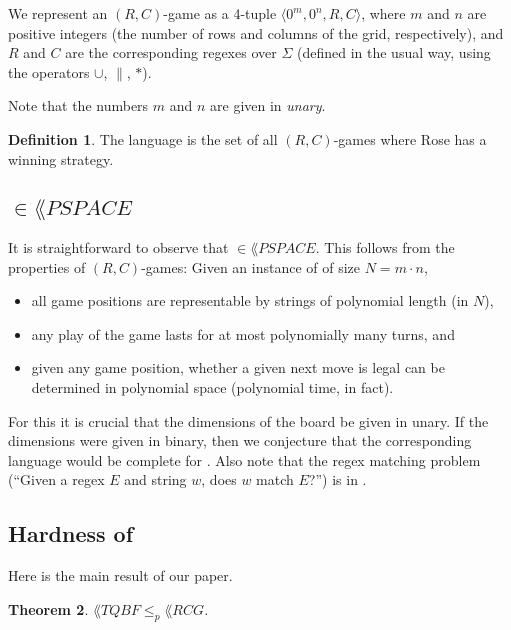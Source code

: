 \documentclass{article}
\newcommand{\0}{\mathbf{0}}
\newcommand{\1}{\mathbf{1}}
\newcommand{\2}{\mathbf{2}}
\newcommand{\RCG}{\lang{RCG}}
\newcommand{\tup}[1]{\langle{} #1 \rangle{}}
\newcommand{\reducp}[2]{{{#1} \le_p {#2}}}
\newcounter{row}
\newcounter{col}
\theoremstyle{plain}
\newtheorem{theorem}{Theorem}
\theoremstyle{definition}
\newtheorem{definition}[theorem]{Definition}
\begin{document}
We represent an $(R,C)$-game as a 4-tuple $\tup{0^m,0^n,R,C}$, where $m$ and $n$ are positive integers (the number of rows and columns of the grid, respectively), and $R$ and $C$ are the corresponding regexes over $\Sigma$ (defined in the usual way, using the operators $\cup$, $\|$, $*$).

Note that the numbers $m$ and $n$ are given in \emph{unary}.

\begin{definition}
  The language \emph{\RCG} is the set of all $(R,C)$-games where Rose has a winning strategy.
\end{definition}

\subsection{\texorpdfstring{ $\in \lang{PSPACE}$}{RCG in PSPACE}}

It is straightforward to observe that  $\in \lang{PSPACE}$.  This follows from the properties of $(R,C)$-games: Given an instance of  of size $N = m \cdot n$,
\begin{itemize}
  \item
        all game positions are representable by strings of polynomial length (in $N$),
  \item
        any play of the game lasts for at most polynomially many turns, and
  \item
        given any game position, whether a given next move is legal can be determined in polynomial space (polynomial time, in fact).
\end{itemize}
For this it is crucial that the dimensions of the board be given in unary.  If the dimensions were given in binary, then we conjecture that the corresponding language would be complete for .  Also note that the regex matching problem (``Given a regex $E$ and string $w$, does $w$ match $E$?'') is in .

\subsection{Hardness of \texorpdfstring{}{RCG}}

Here is the main result of our paper.

\begin{theorem}\label{thm:RCG-hard}
  $\reducp{\lang{TQBF}}{\lang{RCG}}$.
\end{theorem}
\end{document}
